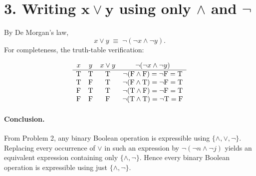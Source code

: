 \section*{3. Writing $\boldsymbol{x\lor y}$ using only $\boldsymbol{\land}$ and $\boldsymbol{\lnot}$}
By De Morgan's law,
\[
x\lor y \;\equiv\; \lnot(\lnot x \land \lnot y).
\]
For completeness, the truth-table verification:

\[
\begin{array}{c c c c}
x & y & x\lor y & \lnot(\lnot x \land \lnot y)\\ \hline
\mathrm{T} & \mathrm{T} & \mathrm{T} & \lnot(\mathrm{F}\land \mathrm{F})=\lnot\mathrm{F}=\mathrm{T}\\
\mathrm{T} & \mathrm{F} & \mathrm{T} & \lnot(\mathrm{F}\land \mathrm{T})=\lnot\mathrm{F}=\mathrm{T}\\
\mathrm{F} & \mathrm{T} & \mathrm{T} & \lnot(\mathrm{T}\land \mathrm{F})=\lnot\mathrm{F}=\mathrm{T}\\
\mathrm{F} & \mathrm{F} & \mathrm{F} & \lnot(\mathrm{T}\land \mathrm{T})=\lnot\mathrm{T}=\mathrm{F}
\end{array}
\]

\paragraph{Conclusion.}
From Problem 2, any binary Boolean operation is expressible using $\{\land,\lor,\lnot\}$.
Replacing every occurrence of $\lor$ in such an expression by $\lnot(\lnot n \land \lnot j)$
yields an equivalent expression containing only $\{\land,\lnot\}$.
Hence every binary Boolean operation is expressible using just $\{\land,\lnot\}$.
